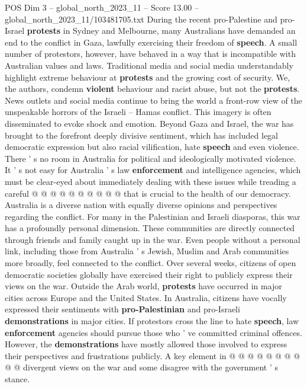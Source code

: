 \begin{textsample}{POS Dim 3 – global\_north\_2023\_11 – Score 13.00 – global\_north\_2023\_11/103481705.txt}  \label{ex:f3_pos_175}
During the recent pro-Palestine and pro-Israel \textbf{protests} in Sydney and Melbourne, many Australians have demanded an end to the conflict in Gaza, lawfully exercising their freedom of \textbf{speech}.
A small number of protestors, however, have behaved in a way that is incompatible with Australian values and laws.
Traditional media and social media understandably highlight extreme behaviour at \textbf{protests} and the growing cost of security.
We, the authors, condemn \textbf{violent} behaviour and racist abuse, but not the \textbf{protests}.
News outlets and social media continue to bring the world a front-row view of the unspeakable horrors of the Israeli -- Hamas conflict.
This imagery is often disseminated to evoke shock and emotion.
Beyond Gaza and Israel, the war has brought to the forefront deeply divisive sentiment, which has included legal democratic expression but also racial vilification, hate \textbf{speech} and even violence.
There ' s no room in Australia for political and ideologically motivated violence.
It ' s not easy for Australia ' s law \textbf{enforcement} and intelligence agencies, which must be clear-eyed about immediately dealing with these issues while treading a careful @ @ @ @ @ @ @ @ @ @ that is crucial to the health of our democracy.
Australia is a diverse nation with equally diverse opinions and perspectives regarding the conflict.
For many in the Palestinian and Israeli diasporas, this war has a profoundly personal dimension.
These communities are directly connected through friends and family caught up in the war.
Even people without a personal link, including those from Australia ' s Jewish, Muslim and Arab communities more broadly, feel connected to the conflict.
Over several weeks, citizens of open democratic societies globally have exercised their right to publicly express their views on the war.
Outside the Arab world, \textbf{protests} have occurred in major cities across Europe and the United States.
In Australia, citizens have vocally expressed their sentiments with \textbf{pro-Palestinian} and pro-Israeli \textbf{demonstrations} in major cities.
If protestors cross the line to hate \textbf{speech}, law \textbf{enforcement} agencies should pursue those who ' ve committed criminal offences.
However, the \textbf{demonstrations} have mostly allowed those involved to express their perspectives and frustrations publicly.
A key element in @ @ @ @ @ @ @ @ @ @ divergent views on the war and some disagree with the government ' s stance.

\end{textsample}
